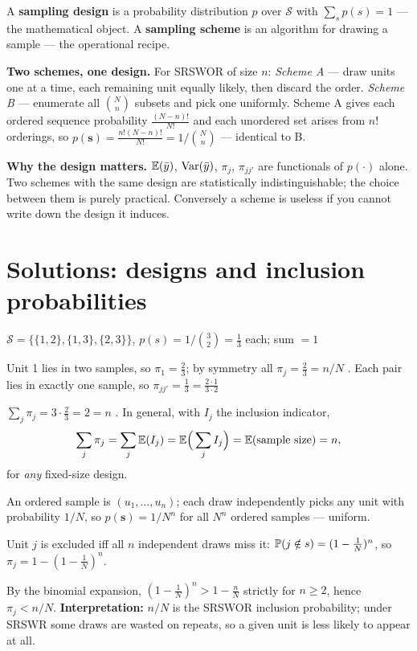 \sol A \textbf{sampling design} is a probability distribution $p$ over $\mathcal S$ with
$\sum_sp(s)=1$ --- the mathematical object. A \textbf{sampling scheme} is an algorithm for
drawing a sample --- the operational recipe.

\textbf{Two schemes, one design.} For SRSWOR of size $n$:
\emph{Scheme A} --- draw units one at a time, each remaining unit equally likely, then discard the
order. \emph{Scheme B} --- enumerate all $\binom Nn$ subsets and pick one uniformly.
Scheme A gives each ordered sequence probability $\frac{(N-n)!}{N!}$ and each unordered set
arises from $n!$ orderings, so $p(\bm s)=\frac{n!(N-n)!}{N!}=1/\binom Nn$ --- identical to B.

\textbf{Why the design matters.} $\mathbb{E}(\bar{y})$, $\operatorname{Var}(\bar{y})$, $\pi_j$, $\pi_{jj'}$ are functionals
of $p(\cdot)$ alone. Two schemes with the same design are statistically indistinguishable; the
choice between them is purely practical. Conversely a scheme is useless if you cannot write down
the design it induces.

\section{Solutions: designs and inclusion probabilities}
\setcounter{qq}{0}

 $\mathcal S=\{\{1,2\},\{1,3\},\{2,3\}\}$, $p(s)=1/\binom32=\frac13$ each; sum $=1$ \checkmark

 Unit 1 lies in two samples, so $\pi_1=\frac23$; by symmetry all $\pi_j=\frac23=n/N$
\checkmark. Each pair lies in exactly one sample, so $\pi_{jj'}=\frac13=\frac{2\cdot1}{3\cdot2}$
\checkmark

 $\sum_j\pi_j=3\cdot\frac23=2=n$ \checkmark. In general, with $I_j$ the inclusion indicator,
\[
  \sum_j\pi_j=\sum_j\mathbb{E}(I_j)=\mathbb{E}\Big(\sum_jI_j\Big)=\mathbb{E}(\text{sample size})=n,
\]
for \emph{any} fixed-size design.

 An ordered sample is $(u_1,\dots,u_n)$; each draw independently picks any unit with
probability $1/N$, so $p(\bm s)=1/N^n$ for all $N^n$ ordered samples --- uniform.

 Unit $j$ is excluded iff all $n$ independent draws miss it:
$\mathbb{P}(j\notin s)=(1-\frac1N)^n$, so $\pi_j=1-(1-\frac1N)^n$.

 By the binomial expansion, $(1-\frac1N)^n>1-\frac nN$ strictly for $n\ge2$, hence
$\pi_j<n/N$. \textbf{Interpretation:} $n/N$ is the SRSWOR inclusion probability; under SRSWR some
draws are wasted on repeats, so a given unit is less likely to appear at all.

